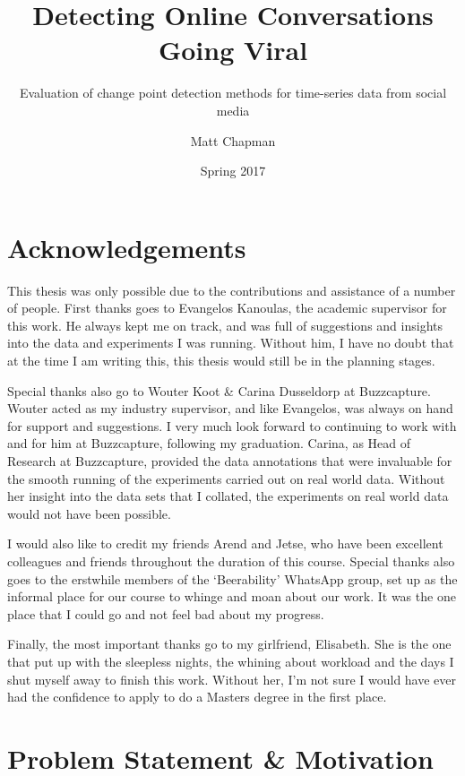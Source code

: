 \documentclass{uvamscse}	%
\title{Detecting Online Conversations Going Viral}
\subtitle{Evaluation of change point detection methods for time-series data from social media}
\date{Spring 2017}
\author{Matt Chapman}
\begin{document}
\maketitle


\chapter*{Acknowledgements}

This thesis was only possible due to the contributions and assistance of a number of people. First thanks goes to Evangelos Kanoulas, the academic supervisor for this work. He always kept me on track, and was full of suggestions and insights into the data and experiments I was running. Without him, I have no doubt that at the time I am writing this, this thesis would still be in the planning stages.

Special thanks also go to Wouter Koot \& Carina Dusseldorp at Buzzcapture. Wouter acted as my industry supervisor, and like Evangelos, was always on hand for support and suggestions. I very much look forward to continuing to work with and for him at Buzzcapture, following my graduation. Carina, as Head of Research at Buzzcapture, provided the data annotations that were invaluable for the smooth running of the experiments carried out on real world data. Without her insight into the data sets that I collated, the experiments on real world data would not have been possible.

I would also like to credit my friends Arend and Jetse, who have been excellent colleagues and friends throughout the duration of this course. Special thanks also goes to the erstwhile members of the `Beerability' WhatsApp group, set up as the informal place for our course to whinge and moan about our work. It was the one place that I could go and not feel bad about my progress.

Finally, the most important thanks go to my girlfriend, Elisabeth. She is the one that put up with the sleepless nights, the whining about workload and the days I shut myself away to finish this work. Without her, I'm not sure I would have ever had the confidence to apply to do a Masters degree in the first place.

\chapter{Problem Statement \& Motivation}
\end{document}
